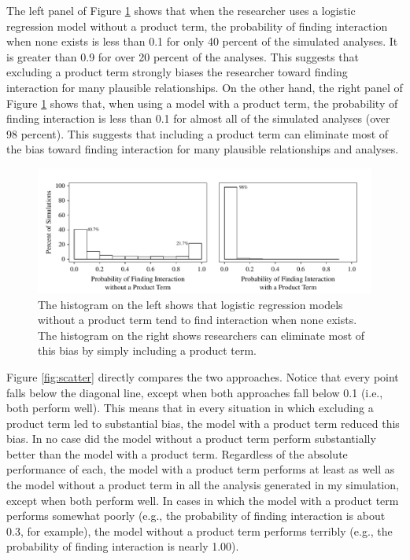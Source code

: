 \documentclass[12pt]{article}
\begin{document}
The left panel of Figure \ref{fig:hist} shows that when the researcher uses a logistic regression model without a product term, the probability of finding interaction when none exists is less than 0.1  for  only 40 percent of the simulated analyses. It is greater than 0.9 for over 20 percent of the analyses. This suggests that excluding a product term strongly biases the researcher toward finding interaction for many plausible relationships. On the other hand, the right panel of Figure  \ref{fig:hist} shows that, when using a model with a product term, the probability of finding interaction is less than 0.1  for almost all of the simulated analyses  (over 98 percent).
This suggests that including a product term can eliminate most of the bias toward finding interaction for many plausible relationships and analyses.

\begin{figure}[h]
\begin{center}
\includegraphics[scale = .7]{fig/fig_hist.pdf}
\end{center}\caption{The histogram on the left shows that logistic regression models without a product term tend to find interaction when none exists. The histogram on the right shows researchers can eliminate most of this bias by simply including a product term.}\label{fig:hist}
\end{figure}

Figure \ref{fig:scatter} directly compares the two approaches. Notice that every point falls below the diagonal line, except when both approaches fall below 0.1 (i.e., both perform well). This means that in every situation in which excluding a product term led to substantial bias, the model with a product term reduced this bias. In no case did the model without a product term perform substantially better than the model with a product term. Regardless of the absolute performance of each, the model with a product term performs at least as well as the model without a product term in all the analysis generated in my simulation, except when both perform well. In cases in which the model with a product term performs somewhat poorly (e.g., the probability of finding interaction is about 0.3, for example), the model without a product term performs terribly (e.g., the probability of finding interaction is nearly 1.00).
 
\end{document}
